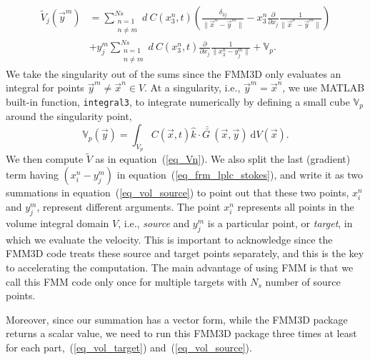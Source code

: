 \begin{align}
	\tilde{V}_j (\vec{y}^m) 
	& = \sum_{\substack{n=1 \\ n \neq m}}^{Ns} 
		d \ {C}(x_3^n, t)
		\left(
			\frac{ \delta_{3j} }{\|\vec{x}^n - \vec{y}^m \|}
			- 
			 x_3^n  
			\frac{\partial}{\partial x_j}
				\frac{1}{\|\vec{x}^n - \vec{y}^m \|}
				\right)
			\label{eq_vol_target} \\
			& +
			   y_j^m  
			\sum_{\substack{n=1 \\ n \neq m}}^{Ns} 
			d \ {C}(x_3^n, t)
			\frac{\partial}{\partial x_j}
				\frac{1}{\|x_3^n - y_j^m \|} + \mathbb{V}_p.
\label{eq_vol_source}
\end{align}
We take the singularity out of the sums since the FMM3D only evaluates an integral for points $\vec{y}^m \neq \vec{x}^n \in V$. 
At a singularity, i.e.,  $\vec{y}^m = \vec{x}^n $, we use MATLAB built-in function, \verb+integral3+, to integrate numerically by defining a small cube $\mathbb{V}_p$ around the singularity point,
\begin{equation}
	\mathbb{V}_p(\vec{y}) = 
	 \int_{{V}_p}
		C (\vec{x},t ) \hat{k} \cdot 
		\bar{\bar{G \ }} (\vec{x}, \vec{y} ) 
		\ \text{d}V(\vec{x}).
		\label{eq_vol_int_singular}
	\end{equation}
We then compute $\tilde{V}$ as in equation~(\ref{eq_Vn}).
We also split the last (gradient) term having $\left( x_i^n - y_j^m \right)$ in equation~(\ref{eq_frm_lplc_stokes}), and write it as two summations in equation~(\ref{eq_vol_source}) to point out that these two points, $x_i^n$ and $y_j^m$, represent different arguments. The point $x_i^n$ represents all points in the volume integral domain $V$, i.e., \textit{source} and $y_j^m$ is a particular point, or \textit{target}, in which we evaluate the velocity. This is important to acknowledge since the FMM3D code treats these source and target points separately, and this is the key to accelerating the computation.
The main advantage of using FMM is that we call this FMM code only once for multiple targets with $N_s$ number of source points. 
\par
Moreover, since our summation has a vector form, while the FMM3D package returns a scalar value, we need to run this FMM3D package three times at least for each part,~(\ref{eq_vol_target}) and~(\ref{eq_vol_source}). 
